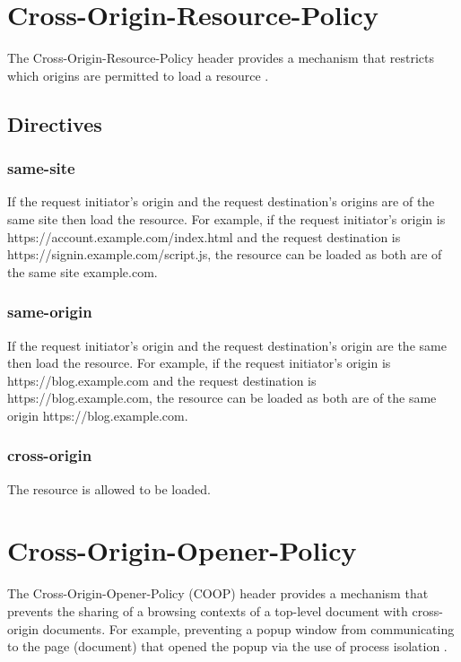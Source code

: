\documentclass{mscreport}
\begin{document}
\section{Cross-Origin-Resource-Policy}

The Cross-Origin-Resource-Policy header provides a mechanism that restricts which origins are permitted to load a resource \cite{Apple_undated-au}.

\subsection{Directives}

\subsubsection{same-site}

If the request initiator’s origin and the request destination’s origins are of the same site then load the resource. For example, if the request initiator’s origin is https://account.example.com/index.html and the request destination is https://signin.example.com/script.js, the resource can be loaded as both are of the same site example.com.

\subsubsection{same-origin}

If the request initiator’s origin and the request destination’s origin are the same then load the resource. For example, if the request initiator’s origin is https://blog.example.com and the request destination is https://blog.example.com, the resource can be loaded as both are of the same origin https://blog.example.com.

\subsubsection{cross-origin}

The resource is allowed to be loaded.

\section{Cross-Origin-Opener-Policy}
The Cross-Origin-Opener-Policy (COOP) header provides a mechanism that prevents the sharing of a browsing contexts of a top-level document with cross-origin documents. For example, preventing a popup window from communicating to the page (document) that opened the popup via the use of process isolation \cite{Apple_undated-gj}.
\end{document}
